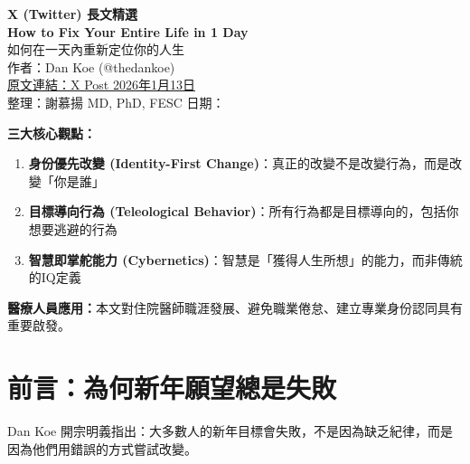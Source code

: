 \documentclass[12pt,a4paper]{article}
\begin{document}

\begin{center}
{\LARGE\bfseries\textcolor{emergency_red}{X (Twitter) 長文精選}}\\[0.5cm]
{\Large\textbf{How to Fix Your Entire Life in 1 Day}}\\[0.3cm]
{\large 如何在一天內重新定位你的人生}\\[0.5cm]
{\normalsize 作者：Dan Koe (@thedankoe)}\\[0.2cm]
{\normalsize \href{https://x.com/thedankoe/status/2010751592346030461}{原文連結：X Post 2026年1月13日}}\\[0.3cm]
{\normalsize 整理：謝慕揚 MD, PhD, FESC \quad 日期：\mydate}
\end{center}

\vspace{0.5cm}


\begin{tcolorbox}[colback=yellow!10!white,colframe=orange!75!black,title=\textbf{核心訊息摘要}]
\textbf{三大核心觀點：}
\begin{enumerate}[leftmargin=*]
    \item \textbf{身份優先改變 (Identity-First Change)}：真正的改變不是改變行為，而是改變「你是誰」
    \item \textbf{目標導向行為 (Teleological Behavior)}：所有行為都是目標導向的，包括你想要逃避的行為
    \item \textbf{智慧即掌舵能力 (Cybernetics)}：智慧是「獲得人生所想」的能力，而非傳統的IQ定義
\end{enumerate}

\textbf{醫療人員應用：}本文對住院醫師職涯發展、避免職業倦怠、建立專業身份認同具有重要啟發。
\end{tcolorbox}

\tableofcontents
\newpage

\section{前言：為何新年願望總是失敗}

Dan Koe 開宗明義指出：大多數人的新年目標會失敗，不是因為缺乏紀律，而是因為他們用錯誤的方式嘗試改變。
\end{document}
